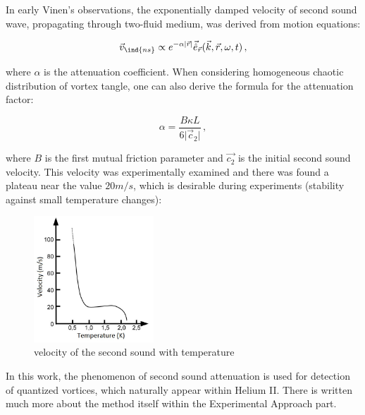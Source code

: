 In early Vinen's observations, the exponentially damped velocity of second sound wave, propagating through two-fluid medium, was derived from motion equations:

\begin{equation}
\vec{v}_{\ind{ns}} \propto e^{-\alpha \vert \vec{r} \vert} \vec{\hat{e}}_{\vec{r}}(\vec{k},\vec{r},\omega,t)\,,
\end{equation}

where $\alpha$ is the attenuation coefficient. When considering homogeneous chaotic distribution of vortex tangle, one can also derive the formula for the attenuation factor:

\begin{equation}
\alpha = \frac{B\kappa L}{6 \vert \vec{c}_2\vert}
\label{alpha_mean}\,,
\end{equation}

where $B$ is the first mutual friction parameter and $\vec{c_2}$ is the initial second sound velocity. This velocity was experimentally examined and there was found a plateau near the value $20 \unit{m/s}$, which is desirable during experiments (stability against small temperature changes):

\begin{figure}[h]
	\centering
	\includegraphics[width=0.4\textwidth]{graphics/theory/ss_velocity}
	\caption{velocity of the second sound with temperature}
	\label{ss_velocity}
\end{figure}

In this work, the phenomenon of second sound attenuation is used for detection of quantized vortices, which naturally appear within Helium II. There is written much more about the method itself within the Experimental Approach part.

\newpage
